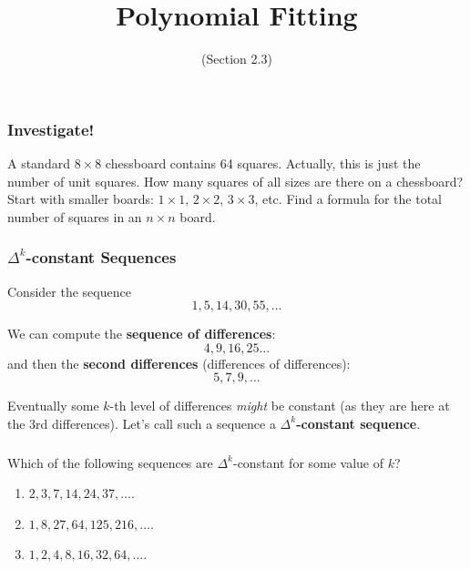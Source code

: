 \documentclass[11pt, compress]{beamer}
\title{Polynomial Fitting}
\subtitle{(Section 2.3)}
\author{}
\date[]{}
\newcommand{\terminology}[1]{\textbf{#1}}
\begin{document}
\begin{frame}
\maketitle 
\end{frame}
 
 
\begin{frame}
\frametitle{Investigate!}
 A standard \(8 \times 8\) chessboard contains 64 squares. Actually, this is just the number of unit squares. How many squares of all sizes are there on a chessboard? Start with smaller boards: \(1\times 1\), \(2 \times 2\), \(3\times 3\), etc. Find a formula for the total number of squares in an \(n\times n\) board.
\end{frame}
 
\begin{frame}
\frametitle{\(\Delta^k\)-constant Sequences}
 Consider the sequence%
\begin{equation*}
1, 5, 14, 30, 55,\ldots
\end{equation*}

 
\pause \vfill 

We can compute the \terminology{sequence of differences}:%
\begin{equation*}
4, 9, 16, 25\ldots
\end{equation*}
and then the \terminology{second differences} (differences of differences):%
\begin{equation*}
5, 7, 9,\ldots
\end{equation*}

 
\pause \vfill 

Eventually some \(k\)-th level of differences \emph{might} be constant (as they are here at the 3rd differences).  Let's call such a sequence a \terminology{\(\Delta^k\)-constant sequence}.
\end{frame}
 
\begin{frame}
\frametitle{}
\begin{example}[2.3.1]Which of the following sequences are \(\Delta^k\)-constant for some value of \(k\)?\begin{enumerate}
\item{} \(2, 3, 7, 14, 24, 37,\ldots\).

\item{} \(1, 8, 27, 64, 125, 216, \ldots\).

\item{} \(1,2,4,8,16,32,64,\ldots\).
\end{enumerate}

\end{example}
\end{frame}
 
\end{document}
